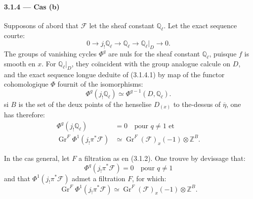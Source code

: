 \documentclass[12pt,a4paper]{article}
\theoremstyle{plain}
\theoremstyle{definition}
\theoremstyle{remark}
\DeclareMathOperator{\Gr}{Gr}
\newcommand{\QQ}{{\mathbb{Q}}}
\newcommand{\ZZ}{{\mathbb{Z}}}
\begin{document}
\paragraph{3.1.4 --- Cas (b)}
Supposons of abord that $\mathscr{F}$ let the sheaf constant $\QQ_\ell$. Let the exact sequence courte:
\begin{equation}\label{eq:3.1.4.1}
0 \to j_! \QQ_\ell \to \QQ_\ell \to \QQ_\ell|_D \to 0.
\end{equation}
The groups of vanishing cycles $\Phi^q$ are nuls for the sheaf constant $\QQ_\ell$, puisque $f$ is smooth en $x$. For $\QQ_\ell|_D$, they co\"incident with the group analogue calcule on $D$, and the exact sequence longue deduite of (3.1.4.1) by map of the functor cohomologique $\Phi$ fournit of the isomorphisms:
\begin{equation}\label{eq:3.1.4.2}
\Phi^q(j_! \QQ_\ell) \simeq \Phi^{q-1}(D, \QQ_\ell).
\end{equation}
si $B$ is the set of the deux points of the henselise $D_{(x)}$ to the-dessus of $\overline{\eta}$, one has therefore:
\begin{align}
\Phi^q(j_! \QQ_\ell) &= 0 \quad \text{pour } q \neq 1 \text{ et} \label{eq:3.1.4.3} \\
\Gr^F \Phi^1(j_! \pi^*\mathscr{F}) &\simeq \Gr^F(\mathscr{F})_x(-1) \otimes \ZZ^B. \label{eq:3.1.4.4}
\end{align}

In the cas general, let $F$ a filtration as en (3.1.2). One trouve by devissage that:
\begin{equation}\label{eq:3.1.4.5}
\Phi^q(j_! \pi^*\mathscr{F}) = 0 \quad \text{pour } q \neq 1
\end{equation}
and that $\Phi^1(j_! \pi^*\mathscr{F})$ admet a filtration $F$, for which:
\begin{equation}\label{eq:3.1.4.6}
\Gr^F \Phi^1(j_! \pi^*\mathscr{F}) \simeq \Gr^F(\mathscr{F})_x(-1) \otimes \ZZ^B.
\end{equation}
\end{document}

